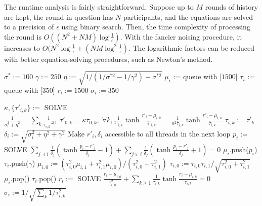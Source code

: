 \documentclass{article}
\begin{document}
The runtime analysis is fairly straightforward. Suppose up to $M$ rounds of history are kept, the round in question has $N$ participants, and the equations are solved to a precision of $\epsilon$ using binary search. Then, the time complexity of processing the round is $O((N^2 + NM)\log\frac 1\epsilon)$. With the fancier noising procedure, it increases to $O(N^2\log\frac 1\epsilon + (NM\log^2\frac 1\epsilon)$. The logarithmic factors can be reduced with better equation-solving procedures, such as Newton's method.

\begin{algorithm}
\caption{$init()$}
\label{alg:init}
\begin{algorithmic}
\STATE $\sigma^* := 100$
\STATE $\gamma := 250$
\STATE $\eta := \sqrt{1 / \left( 1/\sigma^{*2} - 1/\gamma^2 \right) - \sigma^{*2}}$
\STATE $\mu_i$ := queue with [$1500$]
\STATE $\tau_i$ := queue with [$350$]
\STATE $r_i := 1500$
\STATE $\sigma_i := 350$
\ENDFOR
\end{algorithmic}
\end{algorithm}

\begin{algorithm}
\caption{$update()$}
\label{alg:update}
\begin{algorithmic}
\STATE $\kappa,\{\tau'_{i,k}\} := $ SOLVE $\frac{1}{\bar\sigma_i^2 + \bar\eta^2} = \sum_k\frac{1}{\bar\tau_{i,k}'^2},\;\tau'_{0,k}=\kappa\tau_{0,k},\;\forall k,\frac{1}{\bar\tau'_{i,k}} \tanh \frac {r'_i-\mu_{i,k}} {\bar\tau'_{i,k}}
= \frac{1}{\kappa^2\bar\tau_{i,k}} \tanh \frac {r'_i-\mu_{i,k}} {\bar\tau_{i,k}}$
\STATE $\tau_{i,k} := \tau'_k$
\ENDFOR
\STATE $\delta_i := \sqrt{\sigma_i^2 + \eta^2 + \gamma^2}$
\STATE Make $r'_i,\delta_i$ accessible to all threads in the next loop
\ENDFOR
{}
\STATE $p_i := $ SOLVE $\sum_{j\preceq i}\frac{1}{\delta_j}\left( \tanh\frac {p_i - r'_j} {\delta_j} - 1 \right) + \sum_{j\succeq i}\frac{1}{\delta_j}\left( \tanh\frac {p_i - r'_j} {\delta_j} + 1 \right) = 0$
\STATE $\mu_i$.push($p_i$)
\STATE $\tau_i$.push($\gamma$)
\STATE $\mu_{i,0} := \left( \tau_{i,0}^2 \mu_{i,1} + \tau_{i,1}^2 \mu_{i,0} \right) / \left( \tau_{i,0}^2 + \tau_{i,1}^2 \right)$
\STATE $\tau_{i,0} := \tau_{i,0}\tau_{i,1} / \sqrt{ \tau_{i,0}^2 + \tau_{i,1}^2 }$
\STATE $\mu_i$.pop()
\STATE $\tau_i$.pop()
\ENDIF
\STATE $r_i := $ SOLVE $\frac{r_i-\mu_{i,0}}{\tau_{i,0}^2} + \sum_{k\ge 1} \frac{1}{\tau_{i,k}} \tanh \frac {r_i-\mu_{i,k}} {\tau_{i,k}} = 0$
\STATE $\sigma_i := 1 / \sqrt{\sum_k 1/\tau_{i,k}^2}$
\ENDFOR
\end{algorithmic}
\end{algorithm}
\end{document}
